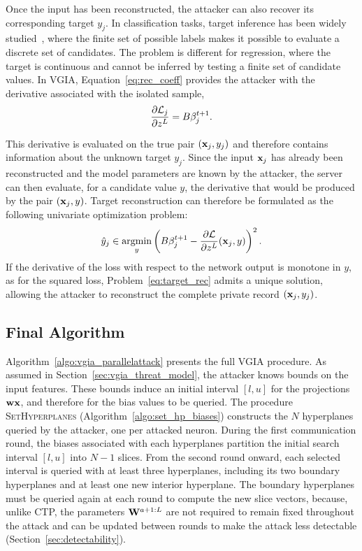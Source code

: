 Once the input has been reconstructed, the attacker can also recover its corresponding target $y_j$. 
In classification tasks, target inference has been widely studied~\cite{yinSeeGradientsImage2021,zhaoIDLGImprovedDeep2020,kariyappaCocktailPartyAttack2023,liE2EGIEndtoEndGradient2023}, where the finite set of possible labels makes it possible to evaluate a discrete set of candidates.
The problem is different for regression, where the target is continuous and cannot be inferred by testing a finite set of candidate values. In VGIA, Equation~\eqref{eq:rec_coeff} provides the attacker with the derivative associated with the isolated sample,
\[
\frac{\partial \mathcal{L}_j}{\partial z^L} = B\beta_j^{t+1}.
\]

This derivative is evaluated on the true pair $({\mathbf{x}}_j,y_j)$ and therefore contains information about the unknown target $y_j$. Since the input ${\mathbf{x}}_j$ has already been reconstructed and the model parameters are known by the attacker, the server can then evaluate, for a candidate value $y$, the derivative that would be produced by the pair $({\mathbf{x}}_j,y)$. Target reconstruction can therefore be formulated as the following univariate optimization problem:
\begin{equation}
\hat{y}_j \in
\operatorname*{argmin}_y
\left(
B\beta_j^{t+1}
-
\frac{\partial \mathcal{L}}{\partial z^L}({\mathbf{x}}_j,y)
\right)^2.
\label{eq:target_rec}
\end{equation}
If the derivative of the loss with respect to the network output is monotone in $y$, as for the squared loss, Problem~\eqref{eq:target_rec} admits a unique solution, allowing the attacker to reconstruct the complete private record $({\mathbf{x}}_j,y_j)$. 

\subsection{Final Algorithm}

Algorithm~\ref{algo:vgia_parallelattack} presents the full VGIA procedure. As assumed in Section~\ref{sec:vgia_threat_model}, the attacker knows bounds on the input features. These bounds induce an initial interval $[l,u]$ for the projections $\mathbf w {\mathbf{x}}$, and therefore for the bias values to be queried.
The procedure \textsc{SetHyperplanes} (Algorithm~\ref{algo:set_hp_biases}) constructs the $N$ hyperplanes queried by the attacker, one per attacked neuron. During the first communication round, the biases associated with each hyperplanes partition the initial search interval $[l,u]$ into $N-1$ slices. From the second round onward, each selected interval is queried with at least three hyperplanes, including its two boundary hyperplanes and at least one new interior hyperplane. The boundary hyperplanes must be queried again at each round to compute the new slice vectors, because, unlike CTP, the parameters $\mathbf{W}^{a+1:L}$ are not required to remain fixed throughout the attack and can be updated between rounds to make the attack less detectable (Section~\ref{sec:detectability}). 


